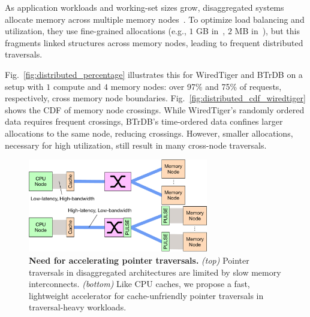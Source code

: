  As application workloads and working-set sizes grow, disaggregated systems allocate memory across multiple memory nodes~\cite{legoos, mind, infiniswap, fastswap}. To optimize load balancing and utilization, they use fine-grained allocations (e.g., $1$ GB in~\cite{legoos}, $2$ MB in~\cite{mind}), but this fragments linked structures across memory nodes, leading to frequent distributed traversals.

Fig.~\ref{fig:distributed_percentage} illustrates this for WiredTiger and BTrDB on a setup with $1$ compute and $4$ memory nodes: over 97\% and 75\% of requests, respectively, cross memory node boundaries. Fig.~\ref{fig:distributed_cdf_wiredtiger} shows the CDF of memory node crossings. While WiredTiger’s randomly ordered data requires frequent crossings, BTrDB’s time-ordered data confines larger allocations to the same node, reducing crossings. However, smaller allocations, necessary for high utilization, still result in many cross-node traversals.


\begin{figure}[t]
  \centering
  \includegraphics[width=0.7\textwidth]{fig/pulse/disagg_vertical.pdf}
  \caption[Need for accelerating pointer traversals]{\textbf{Need for accelerating pointer traversals.} \textit{(top)} Pointer traversals in disaggregated architectures are limited by slow memory interconnects. \textit{(bottom)} Like CPU caches, we propose a fast, lightweight accelerator for cache-unfriendly pointer traversals in traversal-heavy workloads.} 
  \label{fig:disagg}
\end{figure}

